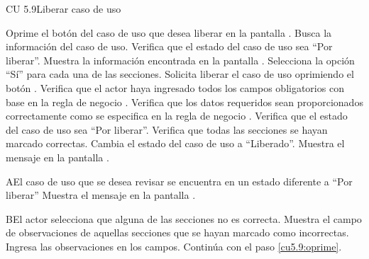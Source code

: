 \begin{UseCase}{CU 5.9}{Liberar caso de uso}
\end{UseCase}
 \begin{UCtrayectoria}
	\UCpaso[\UCactor] Oprime el botón \btnLiberar del caso de uso que desea liberar en la pantalla .
    \UCpaso[\UCsist] Busca la información del caso de uso. 
    \UCpaso[\UCsist] Verifica que el estado del caso de uso sea ``Por liberar''. 
    \UCpaso[\UCsist] Muestra la información encontrada en la pantalla .
    \UCpaso[\UCactor] Selecciona la opción ``Sí'' para cada una de las secciones.  \label{cu5.9:selecciona}
	\UCpaso[\UCactor] Solicita liberar el caso de uso oprimiendo el botón .  \label{cu5.9:oprime}
	\UCpaso[\UCsist] Verifica que el actor haya ingresado todos los campos obligatorios con base en la regla de negocio . 
	\UCpaso[\UCsist] Verifica que los datos requeridos sean proporcionados correctamente como se especifica en la regla de negocio . 
    \UCpaso[\UCsist] Verifica que el estado del caso de uso sea ``Por liberar''. 
    \UCpaso[\UCsist] Verifica que todas las secciones se hayan marcado correctas. 
    \UCpaso[\UCsist] Cambia el estado del caso de uso a ``Liberado''.
    \UCpaso[\UCsist] Muestra el mensaje  en la pantalla .
 \end{UCtrayectoria}
 
 \begin{UCtrayectoriaA}{A}{El caso de uso que se desea revisar se encuentra en un estado diferente a ``Por liberar''}
    \UCpaso[\UCsist] Muestra el mensaje  en la pantalla .
 \end{UCtrayectoriaA} 
 
 \begin{UCtrayectoriaA}{B}{El actor selecciona que alguna de las secciones no es correcta.}
    \UCpaso[\UCsist] Muestra el campo de observaciones de aquellas secciones que se hayan marcado como incorrectas.
    \UCpaso[\UCactor] Ingresa las observaciones en los campos.
	\UCpaso[] Continúa con el paso \ref{cu5.9:oprime}.
 \end{UCtrayectoriaA}
 
